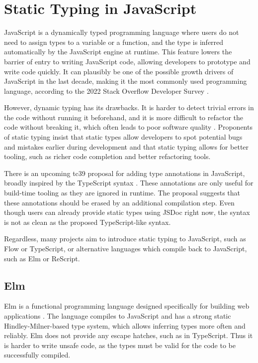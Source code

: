 \section{Static Typing in JavaScript}

JavaScript is a dynamically typed programming language where users do not need to assign types to a variable or a function, and the type is inferred automatically by the JavaScript engine at runtime. This feature lowers the barrier of entry to writing JavaScript code, allowing developers to prototype and write code quickly. It can plausibly be one of the possible growth drivers of JavaScript in the last decade, making it the most commonly used programming language, according to the 2022 Stack Overflow Developer Survey \cite{StackOverflowDeveloper}.

However, dynamic typing has its drawbacks. It is harder to detect trivial errors in the code without running it beforehand, and it is more difficult to refactor the code without breaking it, which often leads to poor software quality \cite{schumacherConceptsProgrammingLanguages2015}. Proponents of static typing insist that static types allow developers to spot potential bugs and mistakes earlier during development and that static typing allows for better tooling, such as richer code completion and better refactoring tools.

There is an upcoming \acrshort{tc39} proposal for adding type annotations in JavaScript, broadly inspired by the TypeScript syntax \cite{ECMAScriptProposalType2023}. These annotations are only useful for build-time tooling as they are ignored in runtime. The proposal suggests that these annotations should be erased by an additional compilation step. Even though users can already provide static types using JSDoc right now, the syntax is not as clean as the proposed TypeScript-like syntax.

Regardless, many projects aim to introduce static typing to JavaScript, such as Flow or TypeScript, or alternative languages which compile back to JavaScript, such as Elm or ReScript.

\subsection{Elm}

Elm is a functional programming language designed specifically for building web applications \cite{ElmDelightfulLanguage}. The language compiles to JavaScript and has a strong static Hindley-Milner-based type system, which allows inferring types more often and reliably. Elm does not provide any escape hatches, such as  in TypeScript. Thus it is harder to write unsafe code, as the types must be valid for the code to be successfully compiled.

